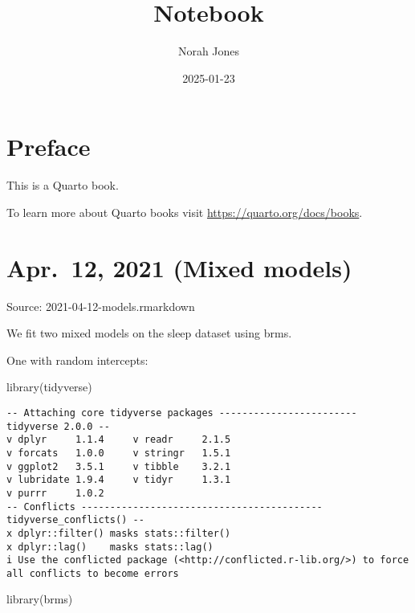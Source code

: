 \documentclass[
  letterpaper,
  DIV=11,
  numbers=noendperiod]{scrreprt}
\title{Notebook}
\author{Norah Jones}
\date{2025-01-23}
\newenvironment{Shaded}{\begin{snugshade}}{\end{snugshade}}
\newcommand{\FunctionTok}[1]{\textcolor[rgb]{0.28,0.35,0.67}{#1}}
\newcommand{\NormalTok}[1]{\textcolor[rgb]{0.00,0.23,0.31}{#1}}
\renewcommand*\contentsname{Table of contents}
\newcommand\contentsname{Table of contents}
\begin{document}
\maketitle

\renewcommand*\contentsname{Table of contents}
{
\hypersetup{linkcolor=}
\setcounter{tocdepth}{2}
\tableofcontents
}

\chapter*{Preface}\label{preface}


This is a Quarto book.

To learn more about Quarto books visit
\url{https://quarto.org/docs/books}.


\chapter{Apr.~12, 2021 (Mixed models)}\label{apr.-12-2021-mixed-models}

Source: 2021-04-12-models.rmarkdown

We fit two mixed models on the sleep dataset using brms.

One with random intercepts:

\begin{Shaded}
\begin{Highlighting}[]
\FunctionTok{library}\NormalTok{(tidyverse)}
\end{Highlighting}
\end{Shaded}

\begin{verbatim}
-- Attaching core tidyverse packages ------------------------ tidyverse 2.0.0 --
v dplyr     1.1.4     v readr     2.1.5
v forcats   1.0.0     v stringr   1.5.1
v ggplot2   3.5.1     v tibble    3.2.1
v lubridate 1.9.4     v tidyr     1.3.1
v purrr     1.0.2     
-- Conflicts ------------------------------------------ tidyverse_conflicts() --
x dplyr::filter() masks stats::filter()
x dplyr::lag()    masks stats::lag()
i Use the conflicted package (<http://conflicted.r-lib.org/>) to force all conflicts to become errors
\end{verbatim}

\begin{Shaded}
\begin{Highlighting}[]
\FunctionTok{library}\NormalTok{(brms)}
\end{Highlighting}
\end{Shaded}
\end{document}
